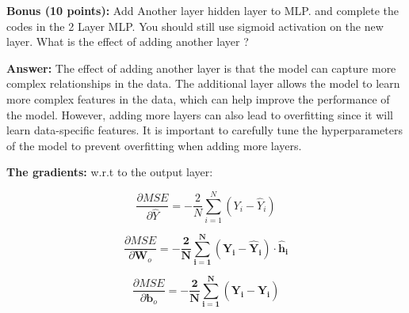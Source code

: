 \documentclass{article}
\begin{document}
\textbf{Bonus (10 points):} Add Another layer hidden layer to MLP. and complete the codes in the 2 Layer MLP.
You should still use sigmoid activation on the new layer. What is the effect of adding another layer ?

\textbf{Answer:}
The effect of adding another layer is that the model can capture more complex relationships in the data. The additional layer allows the model to learn more complex features in the data, which can help improve the performance of the model. However, adding more layers can also lead to overfitting since it will learn data-specific features. It is important to carefully tune the hyperparameters of the model to prevent overfitting when adding more layers.

\textbf{The gradients:}
w.r.t to the output layer:

\[
\frac{\partial MSE}{\partial \hat{Y}} = -\frac{2}{N} \sum_{i=1}^{N} (Y_i - \hat{Y}_i)
\]

\[
\frac{\partial MSE}{\partial \mathbf{W}_o} = \mathbf{-\frac{2}{N} \sum_{i=1}^{N} (Y_i - \hat{Y}_i) \cdot \mathbf{\hat{h}}_i}
\]

\[
\frac{\partial MSE}{\partial \mathbf{b}_o} = \mathbf{-\frac{2}{N} \sum_{i=1}^{N} (Y_i - \hat{Y}_i)}
\]
\end{document}
